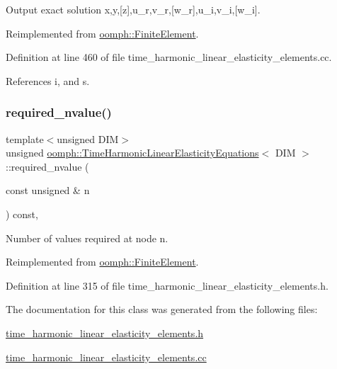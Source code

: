 Output exact solution x,y,\mbox{[}z\mbox{]},u\+\_\+r,v\+\_\+r,\mbox{[}w\+\_\+r\mbox{]},u\+\_\+i,v\+\_\+i,\mbox{[}w\+\_\+i\mbox{]}. 



Reimplemented from \hyperlink{classoomph_1_1FiniteElement_a22b695c714f60ee6cd145be348042035}{oomph\+::\+Finite\+Element}.



Definition at line 460 of file time\+\_\+harmonic\+\_\+linear\+\_\+elasticity\+\_\+elements.\+cc.



References i, and s.

\mbox{\label{classoomph_1_1TimeHarmonicLinearElasticityEquations_a5d00cc9bc6e465257ae9fcae3a48393a}} 
\subsubsection{\texorpdfstring{required\+\_\+nvalue()}{required\_nvalue()}}
{\footnotesize\ttfamily template$<$unsigned D\+IM$>$ \\
unsigned \hyperlink{classoomph_1_1TimeHarmonicLinearElasticityEquations}{oomph\+::\+Time\+Harmonic\+Linear\+Elasticity\+Equations}$<$ D\+IM $>$\+::required\+\_\+nvalue (\begin{DoxyParamCaption}\item[{const unsigned \&}]{n }\end{DoxyParamCaption}) const\hspace{0.3cm}{\ttfamily [inline]}, {\ttfamily [virtual]}}



Number of values required at node n. 



Reimplemented from \hyperlink{classoomph_1_1FiniteElement_a56610c60d5bc2d7c27407a1455471b1a}{oomph\+::\+Finite\+Element}.



Definition at line 315 of file time\+\_\+harmonic\+\_\+linear\+\_\+elasticity\+\_\+elements.\+h.



The documentation for this class was generated from the following files\+:\begin{DoxyCompactItemize}
\item 
\hyperlink{time__harmonic__linear__elasticity__elements_8h}{time\+\_\+harmonic\+\_\+linear\+\_\+elasticity\+\_\+elements.\+h}\item 
\hyperlink{time__harmonic__linear__elasticity__elements_8cc}{time\+\_\+harmonic\+\_\+linear\+\_\+elasticity\+\_\+elements.\+cc}\end{DoxyCompactItemize}
